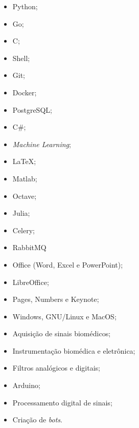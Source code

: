 \documentclass[11pt]{article}
\begin{document}
\begin{multicols}{3} %
\begin{itemize}
    \item Python;
    \item Go;
    \item C;
    \item Shell;
    \item Git;
    \item Docker;
    \item PostgreSQL;
    \item C\#;
    \item \textit{Machine Learning};
    \item \LaTeX ;
    \item Matlab;
    \item Octave;
    \item Julia;
    \item Celery;
    \item RabbitMQ
    \item Office (Word, Excel e PowerPoint);
    \item LibreOffice;
    \item Pages, Numbers e Keynote;
    \item Windows, GNU/Linux e MacOS;
    \item Aquisição de sinais biomédicos;
    \item Instrumentação biomédica e eletrônica;
    \item Filtros analógicos e digitais;
    \item Arduino;
    \item Processamento digital de sinais;
    \item Criação de \textit{bots}.
\end{itemize}
\end{multicols}
\end{document}
